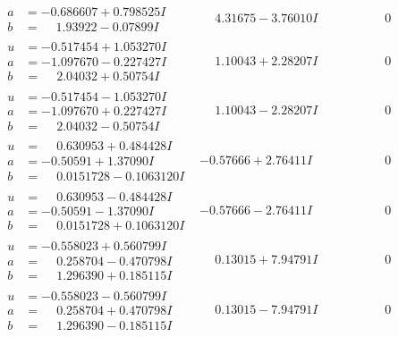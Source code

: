 \documentclass[1p]{elsarticle_modified}
\theoremstyle{definition}
\begin{document}
$$\begin{array}{c|c|c}
\begin{aligned}
a &= -0.686607 + 0.798525 I \\
b &= \phantom{-}1.93922 - 0.07899 I\end{aligned}
 & \phantom{-}4.31675 - 3.76010 I & \phantom{-0.000000 } 0 \\ \hline\begin{aligned}
u &= -0.517454 + 1.053270 I \\
a &= -1.097670 - 0.227427 I \\
b &= \phantom{-}2.04032 + 0.50754 I\end{aligned}
 & \phantom{-}1.10043 + 2.28207 I & \phantom{-0.000000 } 0 \\ \hline\begin{aligned}
u &= -0.517454 - 1.053270 I \\
a &= -1.097670 + 0.227427 I \\
b &= \phantom{-}2.04032 - 0.50754 I\end{aligned}
 & \phantom{-}1.10043 - 2.28207 I & \phantom{-0.000000 } 0 \\ \hline\begin{aligned}
u &= \phantom{-}0.630953 + 0.484428 I \\
a &= -0.50591 + 1.37090 I \\
b &= \phantom{-}0.0151728 - 0.1063120 I\end{aligned}
 & -0.57666 + 2.76411 I & \phantom{-0.000000 } 0 \\ \hline\begin{aligned}
u &= \phantom{-}0.630953 - 0.484428 I \\
a &= -0.50591 - 1.37090 I \\
b &= \phantom{-}0.0151728 + 0.1063120 I\end{aligned}
 & -0.57666 - 2.76411 I & \phantom{-0.000000 } 0 \\ \hline\begin{aligned}
u &= -0.558023 + 0.560799 I \\
a &= \phantom{-}0.258704 - 0.470798 I \\
b &= \phantom{-}1.296390 + 0.185115 I\end{aligned}
 & \phantom{-}0.13015 + 7.94791 I & \phantom{-0.000000 } 0 \\ \hline\begin{aligned}
u &= -0.558023 - 0.560799 I \\
a &= \phantom{-}0.258704 + 0.470798 I \\
b &= \phantom{-}1.296390 - 0.185115 I\end{aligned}
 & \phantom{-}0.13015 - 7.94791 I & \phantom{-0.000000 } 0\\

\end{array}$$
\end{document}
